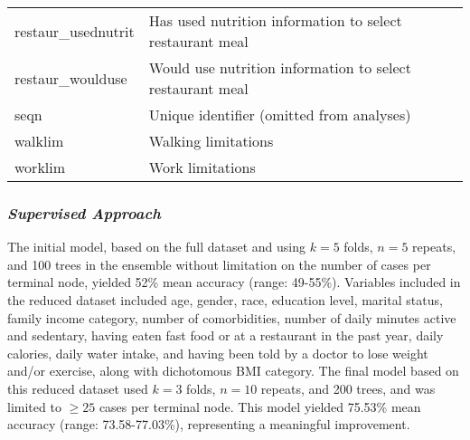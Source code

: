 \documentclass[]{article}
\begin{document}
\begin{longtable}[]{@{}ll@{}}
\begin{minipage}[t]{0.24\columnwidth}
restaur\_usednutrit\strut
\end{minipage} & \begin{minipage}[t]{0.70\columnwidth}\raggedright
Has used nutrition information to select restaurant meal\strut
\end{minipage}\tabularnewline
\begin{minipage}[t]{0.24\columnwidth}\raggedright
restaur\_woulduse\strut
\end{minipage} & \begin{minipage}[t]{0.70\columnwidth}\raggedright
Would use nutrition information to select restaurant meal\strut
\end{minipage}\tabularnewline
\begin{minipage}[t]{0.24\columnwidth}\raggedright
seqn\strut
\end{minipage} & \begin{minipage}[t]{0.70\columnwidth}\raggedright
Unique identifier (omitted from analyses)\strut
\end{minipage}\tabularnewline
\begin{minipage}[t]{0.24\columnwidth}\raggedright
walklim\strut
\end{minipage} & \begin{minipage}[t]{0.70\columnwidth}\raggedright
Walking limitations\strut
\end{minipage}\tabularnewline
\begin{minipage}[t]{0.24\columnwidth}\raggedright
worklim\strut
\end{minipage} & \begin{minipage}[t]{0.70\columnwidth}\raggedright
Work limitations\strut
\end{minipage}\tabularnewline
\bottomrule
\end{longtable}

\hypertarget{supervised-approach-1}{%
\subsubsection{\texorpdfstring{\emph{Supervised
Approach}}{Supervised Approach}}\label{supervised-approach-1}}

The initial model, based on the full dataset and using \(k = 5\) folds,
\(n = 5\) repeats, and 100 trees in the ensemble without limitation on
the number of cases per terminal node, yielded 52\% mean accuracy
(range: 49-55\%). Variables included in the reduced dataset included
age, gender, race, education level, marital status, family income
category, number of comorbidities, number of daily minutes active and
sedentary, having eaten fast food or at a restaurant in the past year,
daily calories, daily water intake, and having been told by a doctor to
lose weight and/or exercise, along with dichotomous BMI category. The
final model based on this reduced dataset used \(k = 3\) folds,
\(n = 10\) repeats, and 200 trees, and was limited to \(\ge 25\) cases
per terminal node. This model yielded 75.53\% mean accuracy (range:
73.58-77.03\%), representing a meaningful improvement.
\end{document}
